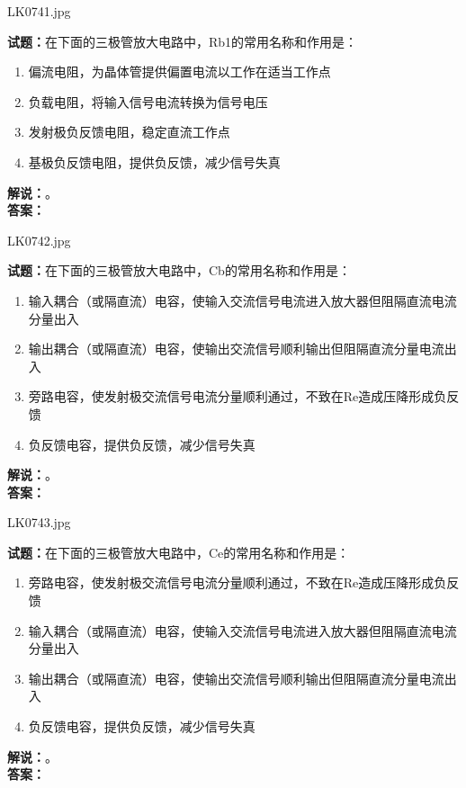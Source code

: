 \documentclass{ctexbook}
\begin{document}
\bigskip

LK0741.jpg

\noindent\textbf{试题：}在下面的三极管放大电路中，Rb1的常用名称和作用是：
\begin{enumerate}[leftmargin=3em]
  \item 偏流电阻，为晶体管提供偏置电流以工作在适当工作点
  \item 负载电阻，将输入信号电流转换为信号电压
  \item 发射极负反馈电阻，稳定直流工作点
  \item 基极负反馈电阻，提供负反馈，减少信号失真
\end{enumerate}
\noindent\textbf{解说：}\textbf{}。\\\noindent\textbf{答案：}

\bigskip

LK0742.jpg

\noindent\textbf{试题：}在下面的三极管放大电路中，Cb的常用名称和作用是：
\begin{enumerate}[leftmargin=3em]
  \item 输入耦合（或隔直流）电容，使输入交流信号电流进入放大器但阻隔直流电流分量出入
  \item 输出耦合（或隔直流）电容，使输出交流信号顺利输出但阻隔直流分量电流出入
  \item 旁路电容，使发射极交流信号电流分量顺利通过，不致在Re造成压降形成负反馈
  \item 负反馈电容，提供负反馈，减少信号失真
\end{enumerate}
\noindent\textbf{解说：}\textbf{}。\\\noindent\textbf{答案：}

\bigskip

LK0743.jpg

\noindent\textbf{试题：}在下面的三极管放大电路中，Ce的常用名称和作用是：
\begin{enumerate}[leftmargin=3em]
  \item 旁路电容，使发射极交流信号电流分量顺利通过，不致在Re造成压降形成负反馈
  \item 输入耦合（或隔直流）电容，使输入交流信号电流进入放大器但阻隔直流电流分量出入
  \item 输出耦合（或隔直流）电容，使输出交流信号顺利输出但阻隔直流分量电流出入
  \item 负反馈电容，提供负反馈，减少信号失真
\end{enumerate}
\noindent\textbf{解说：}\textbf{}。\\\noindent\textbf{答案：}

\bigskip
\end{document}
